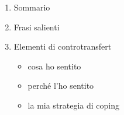 
\begin{enumerate}
\item Sommario
\item Frasi salienti
\item Elementi di controtransfert
\begin{itemize}
\item cosa ho sentito
\item perché l'ho sentito
\item la mia strategia di coping
\end{itemize}
\end{enumerate}
